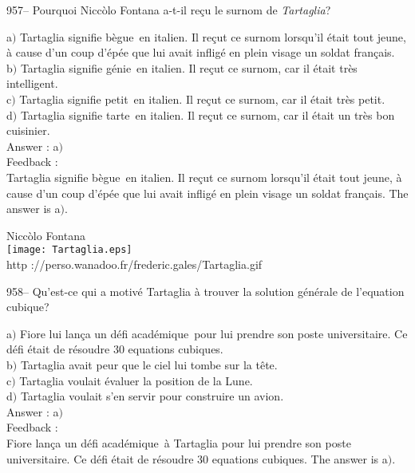 ﻿\documentclass[letterpaper, 12pt]{article}
\begin{document}
957-- Pourquoi Nicc\`olo Fontana a-t-il re\c cu le surnom de {\sl
Tartaglia}?

a$)$ Tartaglia signifie \og b\`egue\fg\ en italien. Il re\c cut ce
surnom lorsqu'il \'etait tout jeune, \`a cause d'un coup d'\'ep\'ee
que lui avait inflig\'e en plein visage un
soldat fran\c cais. \\
b$)$ Tartaglia signifie \og g\'enie\fg\ en italien. Il re\c cut ce
surnom, car il
\'etait tr\`es intelligent.  \\
c$)$ Tartaglia signifie \og petit\fg\ en italien. Il re\c cut ce
surnom, car il \'etait tr\`es petit.  \\
d$)$ Tartaglia signifie \og tarte\fg\ en italien. Il re\c cut ce
surnom, car il \'etait un tr\`es bon cuisinier.\\

Answer : a$)$\\

Feedback :\\
Tartaglia signifie \og b\`egue\fg\ en italien. Il re\c cut ce surnom
lorsqu'il \'etait tout jeune, \`a cause d'un coup d'\'ep\'ee  que
lui avait inflig\'e en plein visage un
soldat fran\c cais. The answer is a$)$.\\

        \begin{center}
        Nicc\`olo Fontana\\
    \texttt{[image: Tartaglia.eps]}\\
        {\footnotesize http
://perso.wanadoo.fr/frederic.gales/Tartaglia.gif}
    \end{center}

958-- Qu'est-ce qui a motiv\'e Tartaglia \`a trouver la solution
g\'en\'erale de l'equation cubique?

a$)$ Fiore lui lan\c ca un \og d\'efi acad\'emique\fg\ pour lui
prendre son poste universitaire. Ce d\'efi \'etait
de r\'esoudre 30 equations cubiques. \\
b$)$ Tartaglia avait peur que le ciel lui tombe sur la t\^ete.   \\
c$)$ Tartaglia voulait \'evaluer la position de la Lune.   \\
d$)$ Tartaglia voulait s'en servir pour construire un avion. \\

Answer : a$)$\\

Feedback : \\
Fiore lan\c ca un \og d\'efi acad\'emique\fg\ \`a Tartaglia pour lui
prendre son poste universitaire. Ce d\'efi \'etait
de r\'esoudre 30 equations cubiques. The answer is a$)$.\\
\end{document}
